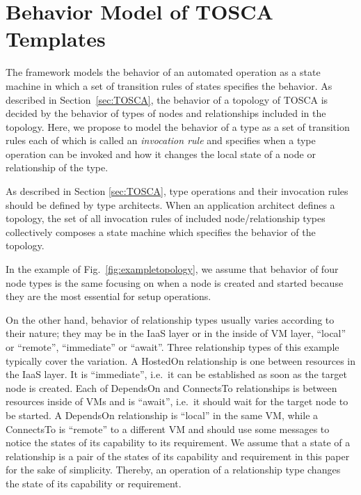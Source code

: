 \documentclass[12pt]{report}
\begin{document}
\section{Behavior Model of TOSCA Templates}
\label{sec:TOSCAbehavior}
The framework models the behavior of an automated operation as a state
machine in which a set of transition rules of states specifies the
behavior. As described in Section~\ref{sec:TOSCA}, the behavior of a
topology of TOSCA is decided by the behavior of types of nodes and
relationships included in the topology. Here, we propose to model the
behavior of a type as a set of transition rules each of which is
called an {\it invocation rule} and specifies when a type operation can
be invoked and how it changes the local state of a node or
relationship of the type.

As described in Section \ref{sec:TOSCA}, type operations and their
invocation rules should be defined by type architects. When an
application architect defines a topology, the set of all invocation
rules of included node/relationship types collectively composes a
state machine which specifies the behavior of the topology.

In the example of Fig.~\ref{fig:exampletopology}, we assume that
behavior of four node types is the same focusing on when a node is
created and started because they are the most essential for setup
operations.

On the other hand, behavior of relationship types usually varies
according to their nature; they may be in the IaaS layer or in the
inside of VM layer, ``local'' or ``remote'', ``immediate'' or
``await''. Three relationship types of this example typically cover
the variation. A HostedOn relationship is one between resources in the
IaaS layer.  It is ``immediate'', i.e.\ it can be established as soon
as the target node is created.  Each of DependsOn and ConnectsTo
relationships is between resources inside of VMs and is ``await'',
i.e.\ it should wait for the target node to be started. A DependsOn
relationship is ``local'' in the same VM, while a ConnectsTo is
``remote'' to a different VM and should use some messages to notice
the states of its capability to its requirement. We assume that a
state of a relationship is a pair of the states of its capability and
requirement in this paper for the sake of simplicity. Thereby, an
operation of a relationship type changes the state of its capability
or requirement.
\end{document}
